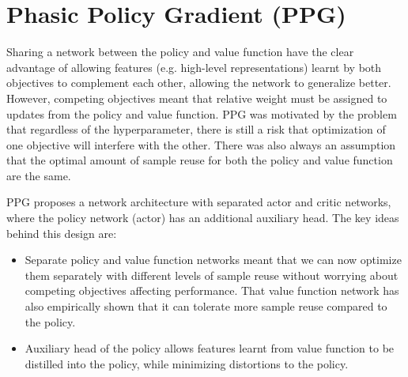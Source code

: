 \documentclass[11pt]{article} %
\begin{document}
\section{Phasic Policy Gradient (PPG)}
Sharing a network between the policy and value function have the clear advantage of allowing features (e.g. high-level representations) learnt by both objectives to complement each other, allowing the network to generalize better. However, competing objectives meant that relative weight must be assigned to updates from the policy and value function. PPG was motivated by the problem that regardless of the hyperparameter, there is still a risk that optimization of one objective will interfere with the other. There was also always an assumption that the optimal amount of sample reuse for both the policy and value function are the same.

PPG proposes a network architecture with separated actor and critic networks, where the policy network (actor) has an additional auxiliary head. The key ideas behind this design are:
\begin{itemize}
    \item Separate policy and value function networks meant that we can now optimize them separately with different levels of sample reuse without worrying about competing objectives affecting performance. That value function network has also empirically shown that it can tolerate more sample reuse compared to the policy.
    \item Auxiliary head of the policy allows features learnt from value function to be distilled into the policy, while minimizing distortions to the policy.
\end{itemize}
\end{document}

